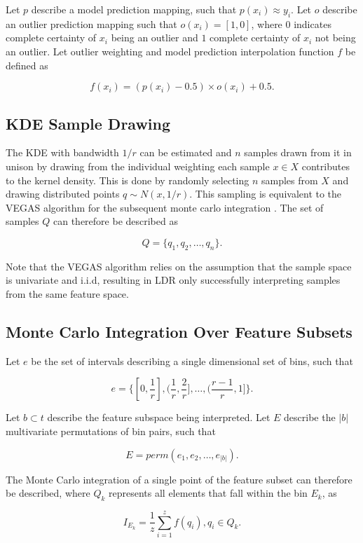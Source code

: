 \documentclass[a4paper, twocolumn]{article}
\begin{document}
Let $p$ describe a model prediction mapping, such that $p(x_i) \approx y_i$. Let $o$ describe an outlier prediction mapping such that $o(x_i) = [1, 0]$, where $0$ indicates complete certainty of $x_i$ being an outlier and $1$ complete certainty of $x_i$ not being an outlier. Let outlier weighting and model prediction interpolation function $f$ be defined as

$$f(x_i) = (p(x_i) - 0.5) \times o(x_i) + 0.5.$$

\subsection{KDE Sample Drawing}

The KDE with bandwidth $1/r$ can be estimated and $n$ samples drawn from it in unison by drawing from the individual weighting each sample $x \in X$ contributes to the kernel density. This is done by randomly selecting $n$ samples from $X$ and drawing distributed points $q \sim N(x, 1/r)$. This sampling is equivalent to the VEGAS algorithm for the subsequent monte carlo integration \cite{lepage1978new}. The set of samples $Q$ can therefore be described as

$$Q = \{q_1, q_2, \ldots, q_n\}.$$

Note that the VEGAS algorithm relies on the assumption that the sample space is univariate and i.i.d, resulting in LDR only successfully interpreting samples from the same feature space.

\subsection{Monte Carlo Integration Over Feature Subsets}

Let $e$ be the set of intervals describing a single dimensional set of bins, such that

$$e = \{[0, \frac{1}{r}], (\frac{1}{r}, \frac{2}{r}], \ldots, (\frac{r-1}{r}, 1]\}.$$

Let $b \subset t$ describe the feature subspace being interpreted. Let $E$ describe the $|b|$ multivariate permutations of bin pairs, such that

$$E = perm(e_1, e_2, \ldots, e_{|b|}).$$

The Monte Carlo integration of a single point of the feature subset can therefore be described, where $Q_k$ represents all elements that fall within the bin $E_k$, as

$$I_{E_k} = \frac{1}{z} \sum^z_{i=1} f(q_i), q_i \in Q_k.$$
\end{document}
